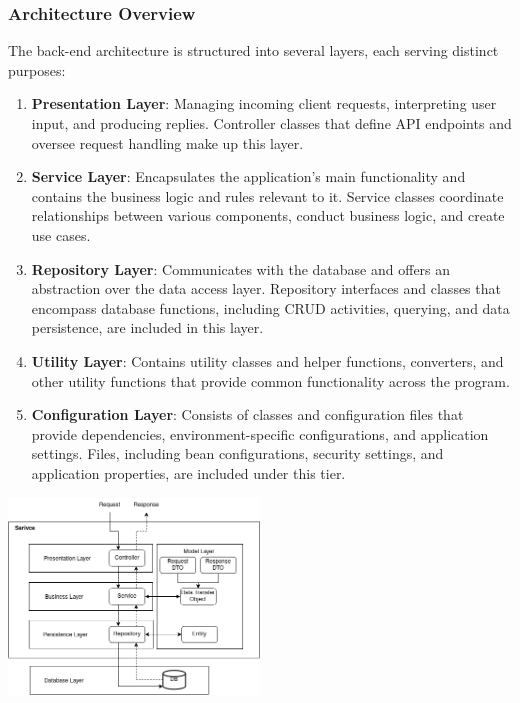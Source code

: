 \documentclass[conference]{IEEEtran}
\begin{document}
\subsubsection{Architecture Overview}

The back-end architecture is structured into several layers, each serving distinct purposes:

\begin{enumerate}
    \item \textbf{Presentation Layer}: Managing incoming client requests, interpreting user input, and producing replies. Controller classes that define API endpoints and oversee request handling make up this layer.
    
    \item \textbf{Service Layer}: Encapsulates the application's main functionality and contains the business logic and rules relevant to it. Service classes coordinate relationships between various components, conduct business logic, and create use cases.
    
    \item \textbf{Repository Layer}: Communicates with the database and offers an abstraction over the data access layer. Repository interfaces and classes that encompass database functions, including CRUD activities, querying, and data persistence, are included in this layer.
    
    \item \textbf{Utility Layer}: Contains utility classes and helper functions, converters, and other utility functions that provide common functionality across the program.
        
    \item \textbf{Configuration Layer}: Consists of classes and configuration files that provide dependencies, environment-specific configurations, and application settings. Files, including bean configurations, security settings, and application properties, are included under this tier.
\end{enumerate}

\begin{center}
    \centering
    \includegraphics[width=0.5\textwidth]{LayeredArchitecture.png}
    \label{fig:backend_architecture}
\end{center}
\end{document}
